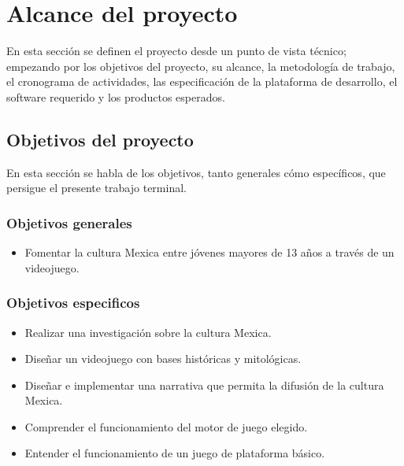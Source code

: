 \chapter{Alcance del proyecto}
En esta sección se definen el proyecto desde un punto de vista técnico; empezando 
por los objetivos del proyecto, su alcance, la metodología de trabajo, 
el cronograma de actividades, las especificación de la plataforma de desarrollo, 
el software requerido y los productos esperados. 
\section{Objetivos del proyecto} \label{Sec_ObjetivosPro}
En esta sección se habla de los objetivos, tanto generales cómo específicos, que persigue el presente trabajo terminal.
	\subsection{Objetivos generales}\label{Sec_ObjetivosGen}		
		\begin{itemize}
			\item Fomentar la cultura Mexica entre jóvenes mayores de 13 años a través de un videojuego.
		\end{itemize}
		
	\subsection{Objetivos especificos} \label{Sec_ObjetivosEsp}
		\begin{itemize}
			\item Realizar una investigación sobre la cultura Mexica.
			\item Diseñar un videojuego con bases históricas y mitológicas.
			\item Diseñar e implementar una narrativa que permita la difusión de la cultura Mexica. 
			\item Comprender el funcionamiento del motor de juego elegido.
			\item Entender el funcionamiento de un juego de plataforma básico.
		\end{itemize}
		
